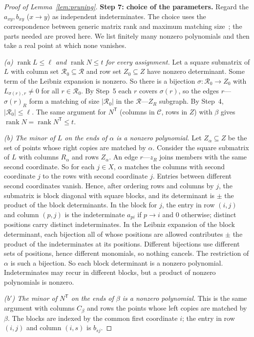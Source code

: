 \documentclass[11pt]{article}
\theoremstyle{remark}
\newcommand{\abs}[1]{\lvert #1\rvert}
\DeclareMathOperator{\rank}{rank}
\newcommand{\step}[1]{\par\medskip\noindent\textbf{#1}\enspace}
\begin{document}
\begin{proof}[Proof of Lemma~\ref{lem:pruning}]
\step{Step 7: choice of the parameters.}
Regard the $a_{xy},b_{xy}$ ($x\to y$) as independent indeterminates.
The choice uses the correspondence between generic matrix rank and maximum
matching size~\cite[Section~5, Theorem~1]{Edmonds1967}; the parts needed
are proved here.  We list finitely many nonzero polynomials and then take a
real point at which none vanishes.

\emph{(a) $\rank L\le\ell$ and $\rank N\le t$ for every assignment.}
Let a square submatrix of $L$ with column set $\mathcal R_0\subseteq\mathcal R$
and row set $Z_0\subseteq Z$ have nonzero determinant.  Some term of the
Leibniz expansion is nonzero.  So there is a bijection
$\sigma:\mathcal R_0\to Z_0$ with $L_{\sigma(r),r}\neq0$ for all
$r\in\mathcal R_0$.  By Step~5 each $r$ covers $\sigma(r)$, so the edges
$r$---$\sigma(r)_R$ form a matching of size $\abs{\mathcal R_0}$ in the
$\mathcal R$---$Z_R$ subgraph.  By Step~4, $\abs{\mathcal R_0}\le\ell$.
The same argument for $N^{\mathsf T}$ (columns in $\mathcal C$, rows in $Z$)
with $\beta$ gives $\rank N=\rank N^{\mathsf T}\le t$.

\emph{(b) The minor of $L$ on the ends of $\alpha$ is a nonzero polynomial.}
Let $Z_\alpha\subseteq Z$ be the set of points whose right copies are matched
by $\alpha$.  Consider the square submatrix of $L$ with columns $R_\alpha$
and rows $Z_\alpha$.  An edge $r$---$z_R$ joins members with the same second
coordinate.  So for each $j\in X$, $\alpha$ matches the columns with second
coordinate $j$ to the rows with second coordinate $j$.  Entries between
different second coordinates vanish.  Hence, after ordering rows and columns
by $j$, the submatrix is block diagonal with square blocks, and its
determinant is $\pm$ the product of the block determinants.
In the block for $j$, the entry in row $(i,j)$ and column $(p,j)$ is the
indeterminate $a_{pi}$ if $p\to i$ and $0$ otherwise; distinct positions
carry distinct indeterminates.  In the Leibniz expansion of the block
determinant, each bijection all of whose positions are allowed contributes
$\pm$ the product of the indeterminates at its positions.  Different
bijections use different sets of positions, hence different monomials, so
nothing cancels.  The restriction of $\alpha$ is such a bijection.  So each
block determinant is a nonzero polynomial.  Indeterminates may recur in
different blocks, but a product of nonzero polynomials is nonzero.

\emph{(b$'$) The minor of $N^{\mathsf T}$ on the ends of $\beta$ is a nonzero
polynomial.}  This is the same argument with columns $C_\beta$ and rows the
points whose left copies are matched by $\beta$.  The blocks are indexed by
the common first coordinate $i$; the entry in row $(i,j)$ and column $(i,s)$
is $b_{sj}$.


\end{proof}
\end{document}

